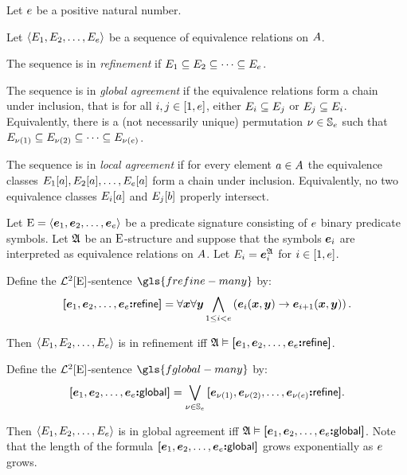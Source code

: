 Let $e$ be a positive natural number.
\begin{definition}
Let $\left\langle E_{1}, E_{2}, \dots, E_{e} \right\rangle$ be a sequence of equivalence
relations on $A$.

The sequence is in \emph{refinement} if $E_{1} \subseteq E_{2} \subseteq
\dots \subseteq E_{e}$.

The sequence is in \emph{global agreement} if the equivalence relations form a
chain under inclusion, that is for all $i, j \in [1, e]$,
either $E_{i} \subseteq E_{j}$ or $E_{j} \subseteq E_{i}$.
Equivalently, there is a (not necessarily unique) permutation
$\nu \in \mathbb{S}_{e}$ such that
$E_{\nu(1)} \subseteq E_{\nu(2)} \subseteq \dots \subseteq
E_{\nu(e)}$.

The sequence is in \emph{local agreement} if for every element $a \in A$
the equivalence classes $E_{1}[a], E_{2}[a], \dots, E_{e}[a]$
form a chain under inclusion.
Equivalently, no two equivalence classes $E_{i}[a]$ and $E_{j}[b]$
properly intersect.
\end{definition}

Let ${\mathrm{E}} = \left\langle \bm{e}_{1}, \bm{e}_{2}, \dots, \bm{e}_{e} \right\rangle$ be a predicate signature
consisting of $e$ binary predicate symbols.
Let $\mathfrak{A}$ be an ${\mathrm{E}}$-structure and suppose that the symbols $\bm{e}_{i}$ are
interpreted as equivalence relations on $A$. Let 
$E_{i} = \bm{e}_{i}^{\mathfrak{A}}$ for $i \in [1,e]$.
\begin{definition}
Define the $\mathcal{L}^{2}[{\mathrm{E}}]$-sentence $\gls{frefine-many}$ by:
\[
  {\bm{[}\bm{e}_{1},\bm{e}_{2},\dots,\bm{e}_{e}\mathord{\bm{:}}\mathsf{refine}\bm{]}} =
  \forall\bm{x}\forall\bm{y} \bigwedge_{1 \leq i < e}
  \left(\bm{e}_{i}(\bm{x},\bm{y}) \rightarrow \bm{e}_{i+1}(\bm{x},\bm{y})\right).
\]
\end{definition}
Then $\left\langle E_{1},E_{2},\dots,E_{e} \right\rangle$ is in refinement iff
$\mathfrak{A} \vDash {\bm{[}\bm{e}_{1},\bm{e}_{2},\dots,\bm{e}_{e}\mathord{\bm{:}}\mathsf{refine}\bm{]}}$.

\begin{definition}
Define the $\mathcal{L}^{2}[{\mathrm{E}}]$-sentence $\gls{fglobal-many}$ by:
\[
  {\bm{[}\bm{e}_{1},\bm{e}_{2},\dots,\bm{e}_{e}\mathord{\bm{:}}\mathsf{global}\bm{]}} =
  \bigvee_{\nu \in \mathbb{S}_{e}}
  {\bm{[}\bm{e}_{\nu(1)},\bm{e}_{\nu(2)},\dots,\bm{e}_{\nu(e)}\mathord{\bm{:}}\mathsf{refine}\bm{]}}.
\]
\end{definition}
Then $\left\langle E_{1},E_{2},\dots,E_{e} \right\rangle$ is in global agreement iff
$\mathfrak{A} \vDash {\bm{[}\bm{e}_{1},\bm{e}_{2},\dots,\bm{e}_{e}\mathord{\bm{:}}\mathsf{global}\bm{]}}$.
Note that the length of the formula ${\bm{[}\bm{e}_{1},\bm{e}_{2},\dots,\bm{e}_{e}\mathord{\bm{:}}\mathsf{global}\bm{]}}$ grows
exponentially as $e$ grows.

